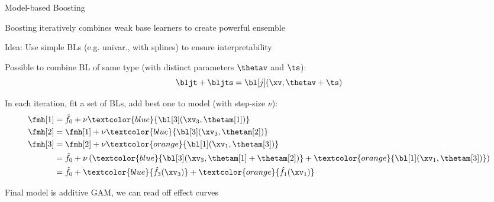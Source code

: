 \documentclass[10pt,compress,t,notes=noshow, xcolor=table]{beamer}
\begin{document}
\begin{framei}[align=top]{Model-based Boosting %
}

\item Boosting iteratively combines weak base learners to create powerful ensemble 
\item
Idea: Use simple BLs (e.g. univar., with splines) to ensure interpretability
\item
Possible to combine BL of same type (with distinct parameters $\thetav$ and $\ts$):
$$\bljt + \bljts = \bl[j](\xv, \thetav + \ts) $$
\pause
\item %
In each iteration, fit a set of BLs, add best one to model (with step-size $\nu$):
\begin{align*}
\fmh[1] &= \hat{f}_0 + \nu \textcolor{blue}{\bl[3](\xv_3, \thetam[1])} \\
\fmh[2] &= \fmh[1] + \nu \textcolor{blue}{\bl[3](\xv_3, \thetam[2])} \\
\fmh[3] &= \fmh[2] + \nu \textcolor{orange}{\bl[1](\xv_1, \thetam[3])} \\
&= \hat{f}_0 + \nu \left(\textcolor{blue}{\bl[3](\xv_3, \thetam[1] + \thetam[2])} + \textcolor{orange}{\bl[1](\xv_1, \thetam[3])}\right) 
\\
&= \hat{f}_0 + \textcolor{blue}{\hat{f}_3(\xv_3)} + \textcolor{orange}{\hat{f}_1(\xv_1)}
\end{align*}
\item Final model is additive GAM, we can read off effect curves
\end{framei}
\end{document}
